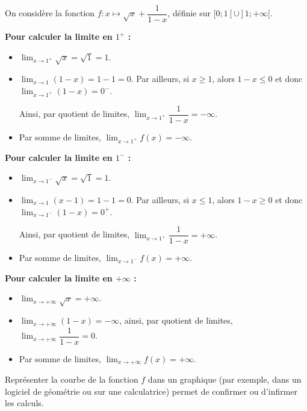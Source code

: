 \documentclass[11pt,fleqn, openany]{book} %
\begin{document}
\begin{example} On considère la fonction $f:x\mapsto \sqrt{x} + \dfrac{1}{1-x}$, définie sur $[0;1[ \cup ]1;+\infty[$.

\textbf{Pour calculer la limite en $1^+$ :}
\begin{itemize}
\item $\displaystyle \lim_{x \to 1^+} \sqrt{x} = \sqrt{1}=1$.
\item $\displaystyle \lim_{x \to 1} (1-x)=1-1=0$. Par ailleurs, si $x \geqslant 1$, alors $1-x \leqslant 0$ et donc $\displaystyle \lim_{x \to 1^+} (1-x)=0^-$. 

Ainsi, par quotient de limites, $\displaystyle \lim_{x \to 1^+} \dfrac{1}{1-x}=-\infty$.
\item Par somme de limites, $\displaystyle \lim_{x \to 1^+} f(x)=-\infty$.

\end{itemize}


\textbf{Pour calculer la limite en $1^-$ :}
\begin{itemize}
\item $\displaystyle \lim_{x \to 1^-} \sqrt{x} = \sqrt{1}=1$.
\item $\displaystyle \lim_{x \to 1} (x-1)=1-1=0$. Par ailleurs, si $x \leqslant 1$, alors $1-x \geqslant 0$ et donc $\displaystyle \lim_{x \to 1^-} (1-x)=0^+$. 

Ainsi, par quotient de limites, $\displaystyle \lim_{x \to 1^+} \dfrac{1}{1-x}=+\infty$.
\item Par somme de limites, $\displaystyle \lim_{x \to 1^-} f(x)=+\infty$.
\end{itemize}

\textbf{Pour calculer la limite en $+\infty$ :}
\begin{itemize}
\item $\displaystyle \lim_{x \to +\infty} \sqrt{x} =+\infty$. 
\item $\displaystyle \lim_{x \to +\infty} (1-x)=-\infty$, ainsi, par quotient de limites, $\displaystyle \lim_{x \to +\infty} \dfrac{1}{1-x}=0$.
\item Par somme de limites, $\displaystyle \lim_{x \to +\infty} f(x)=+\infty$.
\end{itemize}

Représenter la courbe de la fonction $f$ dans un graphique (par exemple, dans un logiciel de géométrie ou sur une calculatrice) permet de confirmer ou d'infirmer les calculs.


\begin{center}
\end{center}
\vspace{-1cm}
\end{example}
\newpage 
\end{document}
